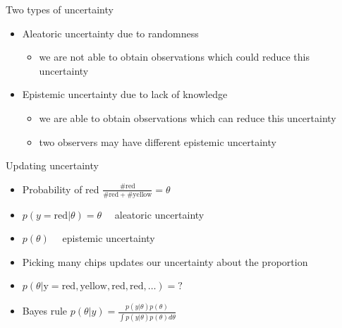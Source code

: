 \documentclass[english,t]{beamer}
\begin{document}
\begin{frame}{Two types of uncertainty}

  \begin{itemize}
  \item Aleatoric uncertainty due to randomness
    \begin{itemize}
    \item<2-> we are not able to obtain observations which could reduce
      this uncertainty
    \end{itemize}
    \vspace{\baselineskip}
  \item Epistemic uncertainty due to lack of knowledge
    \begin{itemize}
    \item<3-> we are able to obtain observations which can reduce
      this uncertainty
    \item<3-> two observers may have different epistemic uncertainty
    \end{itemize}
  \end{itemize}
\end{frame}

\begin{frame}{Updating uncertainty}

  \begin{itemize}
  \item<2-> Probability of red $\frac{\mathrm{\#red}}{\mathrm{\#red+\#yellow}}=\theta$ 
    \vspace{\baselineskip}
  \item<3-> $p(y=\mathrm{red}|\theta)=\theta \quad$ aleatoric uncertainty
    \vspace{\baselineskip}
  \item<4-> $p(\theta) \quad$ epistemic uncertainty
    \vspace{\baselineskip}
  \item<5-> Picking many chips updates our uncertainty about the proportion
    \vspace{\baselineskip}
  \item<5-> $p(\theta|\mathrm{y=red,yellow,red,red,\ldots})=?$
    \vspace{\baselineskip}
  \item<6-> Bayes rule
      $p(\theta|y)=\frac{p(y|\theta)p(\theta)}{\int p(y|\theta)p(\theta) d\theta}$
  \end{itemize}
\end{frame}
\end{document}
